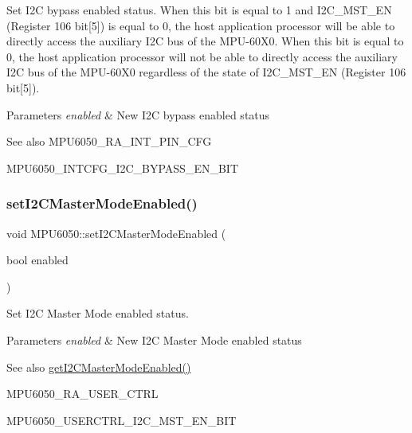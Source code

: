 Set I2C bypass enabled status. When this bit is equal to 1 and I2\+C\+\_\+\+M\+S\+T\+\_\+\+EN (Register 106 bit\mbox{[}5\mbox{]}) is equal to 0, the host application processor will be able to directly access the auxiliary I2C bus of the M\+P\+U-\/60\+X0. When this bit is equal to 0, the host application processor will not be able to directly access the auxiliary I2C bus of the M\+P\+U-\/60\+X0 regardless of the state of I2\+C\+\_\+\+M\+S\+T\+\_\+\+EN (Register 106 bit\mbox{[}5\mbox{]}). 
\begin{DoxyParams}{Parameters}
{\em enabled} & New I2C bypass enabled status \\
\hline
\end{DoxyParams}
\begin{DoxySeeAlso}{See also}
M\+P\+U6050\+\_\+\+R\+A\+\_\+\+I\+N\+T\+\_\+\+P\+I\+N\+\_\+\+C\+FG 

M\+P\+U6050\+\_\+\+I\+N\+T\+C\+F\+G\+\_\+\+I2\+C\+\_\+\+B\+Y\+P\+A\+S\+S\+\_\+\+E\+N\+\_\+\+B\+IT 
\end{DoxySeeAlso}
\mbox{\label{class_m_p_u6050_a6503f0fdfefa0fd287a75032667b7b69}} 
\subsubsection{\texorpdfstring{setI2CMasterModeEnabled()}{setI2CMasterModeEnabled()}}
{\footnotesize\ttfamily void M\+P\+U6050\+::set\+I2\+C\+Master\+Mode\+Enabled (\begin{DoxyParamCaption}\item[{bool}]{enabled }\end{DoxyParamCaption})}

Set I2C Master Mode enabled status. 
\begin{DoxyParams}{Parameters}
{\em enabled} & New I2C Master Mode enabled status \\
\hline
\end{DoxyParams}
\begin{DoxySeeAlso}{See also}
\mbox{\hyperlink{class_m_p_u6050_a6b45e538f2082eb1b1975ed56e3e21bc}{get\+I2\+C\+Master\+Mode\+Enabled()}} 

M\+P\+U6050\+\_\+\+R\+A\+\_\+\+U\+S\+E\+R\+\_\+\+C\+T\+RL 

M\+P\+U6050\+\_\+\+U\+S\+E\+R\+C\+T\+R\+L\+\_\+\+I2\+C\+\_\+\+M\+S\+T\+\_\+\+E\+N\+\_\+\+B\+IT 
\end{DoxySeeAlso}
\mbox{\label{class_m_p_u6050_a67a11be7fc7ab6b1186469b94ea33dda}} 
